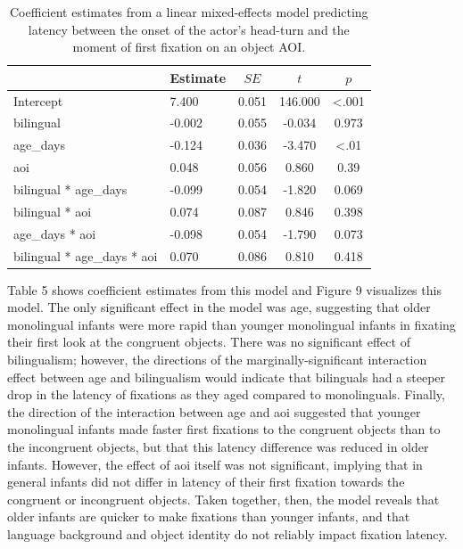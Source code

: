 \documentclass[,man,floatsintext]{apa6}
\begin{document}
\begin{table}[tbp]
\begin{center}
\begin{threeparttable}
\caption{\label{tab:coef_table_latency}Coefficient estimates from a linear mixed-effects model predicting latency between the onset of the actor's head-turn and the moment of first fixation on an object AOI.}
\begin{tabular}{llccc}
\toprule
 & Estimate & $SE$ & $t$ & $p$\\
\midrule
Intercept & 7.400 & 0.051 & 146.000 & <.001\\
bilingual & -0.002 & 0.055 & -0.034 & 0.973\\
age\_days & -0.124 & 0.036 & -3.470 & <.01\\
aoi & 0.048 & 0.056 & 0.860 & 0.39\\
bilingual * age\_days & -0.099 & 0.054 & -1.820 & 0.069\\
bilingual * aoi & 0.074 & 0.087 & 0.846 & 0.398\\
age\_days * aoi & -0.098 & 0.054 & -1.790 & 0.073\\
bilingual * age\_days * aoi & 0.070 & 0.086 & 0.810 & 0.418\\
\bottomrule
\end{tabular}
\end{threeparttable}
\end{center}
\end{table}

\noindent Table 5 shows coefficient estimates from this model and Figure 9 visualizes this model. The only significant effect in the model was age, suggesting that older monolingual infants were more rapid than younger monolingual infants in fixating their first look at the congruent objects. There was no significant effect of bilingualism; however, the directions of the marginally-significant interaction effect between age and bilingualism would indicate that bilinguals had a steeper drop in the latency of fixations as they aged compared to monolinguals. Finally, the direction of the interaction between age and aoi suggested that younger monolingual infants made faster first fixations to the congruent objects than to the incongruent objects, but that this latency difference was reduced in older infants. However, the effect of aoi itself was not significant, implying that in general infants did not differ in latency of their first fixation towards the congruent or incongruent objects. Taken together, then, the model reveals that older infants are quicker to make fixations than younger infants, and that language background and object identity do not reliably impact fixation latency.
\end{document}
